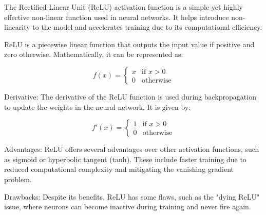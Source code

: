 The Rectified Linear Unit (ReLU) activation function is a simple yet highly effective non-linear function used in neural networks. It helps introduce non-linearity to the model and accelerates training due to its computational efficiency.

ReLU is a piecewise linear function that outputs the input value if positive and zero otherwise. Mathematically, it can be represented as:

\begin{equation}
  f(x) =
  \begin{cases}
    x & \text{if } x > 0 \\
    0 & \text{otherwise}
  \end{cases}
\end{equation}

Derivative: The derivative of the ReLU function is used during backpropagation to update the weights in the neural network. It is given by:

\begin{equation}
  f'(x) =
  \begin{cases}
    1 & \text{if } x > 0 \\
    0 & \text{otherwise}
  \end{cases}
\end{equation}

Advantages: ReLU offers several advantages over other activation functions, such as sigmoid or hyperbolic tangent (tanh). These include faster training due to reduced computational complexity and mitigating the vanishing gradient problem.

Drawbacks: Despite its benefits, ReLU has some flaws, such as the "dying ReLU" issue, where neurons can become inactive during training and never fire again.